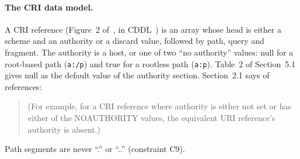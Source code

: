 \documentclass[11pt,a4paper]{article}
\theoremstyle{remark}
\newcommand{\uri}[1]{\texttt{#1}}
\begin{document}
\paragraph{The CRI data model.} A CRI reference (Figure~2 of~\cite{href}, in CDDL~\cite{rfc8610}) is an
array whose head is either a scheme and an authority or a discard value, followed by path, query and
fragment. The authority is a host, or one of two ``no authority'' values: null for a root-based path
(\uri{a:/p}) and true for a rootless path (\uri{a:p}). Table~2 of Section~5.1 gives null as the default
value of the authority section. Section~2.1 says of references:
\begin{quote}\small
(For example, for a CRI reference where authority is either not set or has either of the NOAUTHORITY
values, the equivalent URI reference's authority is absent.)
\end{quote}
Path segments are never ``.'' or ``..'' (constraint C9).
\end{document}
